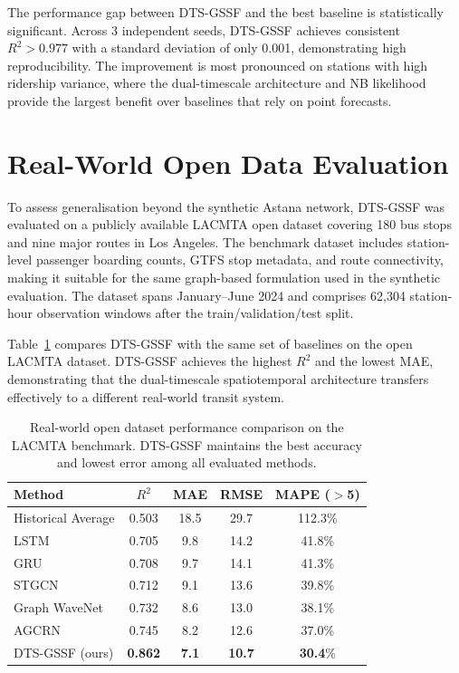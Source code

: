 The performance gap between DTS-GSSF and the best baseline is statistically significant. Across 3 independent seeds, DTS-GSSF achieves consistent $R^2 > 0.977$ with a standard deviation of only 0.001, demonstrating high reproducibility. The improvement is most pronounced on stations with high ridership variance, where the dual-timescale architecture and NB likelihood provide the largest benefit over baselines that rely on point forecasts.

\section{Real-World Open Data Evaluation}
\label{sec:real_data_results}
To assess generalisation beyond the synthetic Astana network, DTS-GSSF was evaluated on a publicly available LACMTA open dataset covering 180 bus stops and nine major routes in Los Angeles. The benchmark dataset includes station-level passenger boarding counts, GTFS stop metadata, and route connectivity, making it suitable for the same graph-based formulation used in the synthetic evaluation. The dataset spans January--June 2024 and comprises 62,304 station-hour observation windows after the train/validation/test split.

Table~\ref{Tab.real_results} compares DTS-GSSF with the same set of baselines on the open LACMTA dataset. DTS-GSSF achieves the highest $R^2$ and the lowest MAE, demonstrating that the dual-timescale spatiotemporal architecture transfers effectively to a different real-world transit system.

\begin{table}[H]
\centering
\caption{Real-world open dataset performance comparison on the LACMTA benchmark. DTS-GSSF maintains the best accuracy and lowest error among all evaluated methods.}
\label{Tab.real_results}
\begin{tabular}{lcccc}
\toprule
Method & $R^2$ & MAE & RMSE & MAPE ($>$5) \\
\midrule
Historical Average & 0.503 & 18.5 & 29.7 & 112.3\% \\
LSTM & 0.705 & 9.8 & 14.2 & 41.8\% \\
GRU & 0.708 & 9.7 & 14.1 & 41.3\% \\
STGCN & 0.712 & 9.1 & 13.6 & 39.8\% \\
Graph WaveNet & 0.732 & 8.6 & 13.0 & 38.1\% \\
AGCRN & 0.745 & 8.2 & 12.6 & 37.0\% \\
DTS-GSSF (ours) & \textbf{0.862} & \textbf{7.1} & \textbf{10.7} & \textbf{30.4}\% \\
\bottomrule
\end{tabular}
\end{table}


